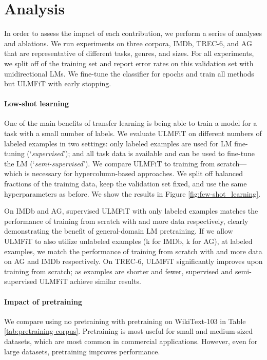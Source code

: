 \documentclass[11pt,a4paper]{article}
\begin{document}
\section{Analysis} \label{sec:analysis}

In order to assess the impact of each contribution, we perform a series of analyses and ablations. We run experiments on three corpora, IMDb, TREC-6, and AG that are representative of different tasks, genres, and sizes. For all experiments, we split off  of the training set and report error rates on this validation set with unidirectional LMs. We fine-tune the classifier for  epochs and train all methods but ULMFiT with early stopping.

\paragraph{Low-shot learning} One of the main benefits of transfer learning is being able to train a model for a task with a small number of labels. We evaluate ULMFiT on different numbers of labeled examples in two settings: only labeled examples are used for LM fine-tuning (`\emph{supervised}'); and all task data is available and can be used to fine-tune the LM (`\emph{semi-supervised}'). We compare ULMFiT to training from scratch---which is necessary for hypercolumn-based approaches. We split off balanced fractions of the training data, keep the validation set fixed, and use the same hyperparameters as before. We show the results in Figure \ref{fig:few-shot_learning}.

On IMDb and AG, supervised ULMFiT with only  labeled examples matches the performance of training from scratch with  and  more data respectively, clearly demonstrating the benefit of general-domain LM pretraining. If we allow ULMFiT to also utilize unlabeled examples (k for IMDb, k for AG), at  labeled examples, we match the performance of training from scratch with  and  more data on AG and IMDb respectively. On TREC-6, ULMFiT significantly improves upon training from scratch; as examples are shorter and fewer, supervised and semi-supervised ULMFiT achieve similar results.

\paragraph{Impact of pretraining} We compare using no pretraining with pretraining on WikiText-103 \cite{Merity2016} in Table \ref{tab:pretraining-corpus}. Pretraining is most useful for small and medium-sized datasets, which are most common in commercial applications. However, even for large datasets, pretraining improves performance.
\end{document}
